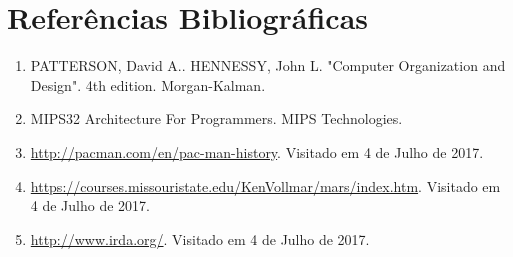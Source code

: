 \documentclass[12pt, a4paper, twocolumn]{article}
\begin{document}

\section{Referências Bibliográficas}

\begin{enumerate}
    \item PATTERSON, David A.. HENNESSY, John L. "Computer Organization and Design". 4th edition. Morgan-Kalman.
    \item MIPS32 Architecture For Programmers. MIPS Technologies.
    \item \url{http://pacman.com/en/pac-man-history}. Visitado em 4 de Julho de 2017.
    \item \url{https://courses.missouristate.edu/KenVollmar/mars/index.htm}. Visitado em 4 de Julho de 2017.
    \item \url{http://www.irda.org/}. Visitado em 4 de Julho de 2017.
    
\end{enumerate}
\end{document}
